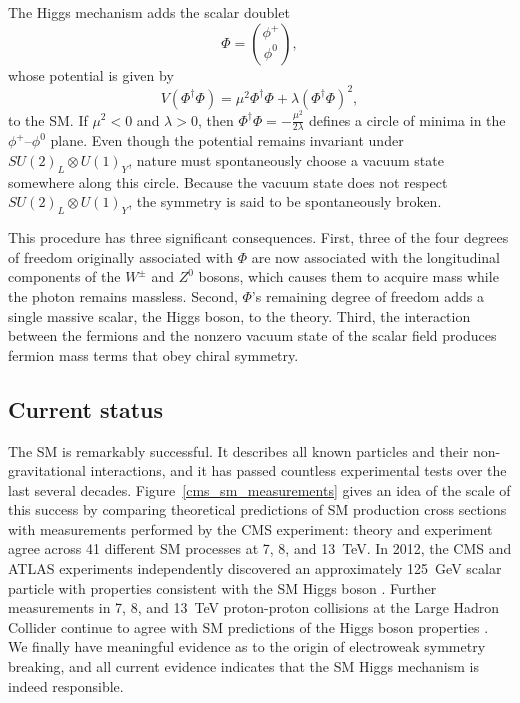 The Higgs mechanism adds the scalar doublet
\begin{equation}
    \Phi = \binom{\phi^{+}}{\phi^{0}},
\end{equation}
whose potential is given by
\begin{equation}
    V(\Phi^{\dagger}\Phi) = \mu^{2}\Phi^{\dagger}\Phi + \lambda(\Phi^{\dagger}\Phi)^{2},
\end{equation}
to the SM. If $\mu^{2}<0$ and $\lambda>0$, then $\Phi^{\dagger}\Phi = -\frac{\mu^{2}}{2\lambda}$ defines a circle of minima in the $\phi^{+}$--$\phi^{0}$ plane. Even though the potential remains invariant under $SU(2)_{L} \otimes U(1)_{Y}$, nature must spontaneously choose a vacuum state somewhere along this circle. Because the vacuum state does not respect $SU(2)_{L} \otimes U(1)_{Y}$, the symmetry is said to be spontaneously broken.

This procedure has three significant consequences. First, three of the four degrees of freedom originally associated with $\Phi$ are now associated with the longitudinal components of the $W^{\pm}$ and $Z^{0}$ bosons, which causes them to acquire mass while the photon remains massless. Second, $\Phi$'s remaining degree of freedom adds a single massive scalar, the Higgs boson, to the theory. Third, the interaction between the fermions and the nonzero vacuum state of the scalar field produces fermion mass terms that obey chiral symmetry.


\subsection{Current status}
\label{sm_status}
The SM is remarkably successful. It describes all known particles and their non-gravitational interactions, and it has passed countless experimental tests over the last several decades. Figure~\ref{cms_sm_measurements} gives an idea of the scale of this success by comparing theoretical predictions of SM production cross sections with measurements performed by the CMS experiment: theory and experiment agree across 41 different SM processes at \num{7}, \num{8}, and \SI{13}{\TeV}. In 2012, the CMS and ATLAS experiments  independently discovered an approximately \SI{125}{\GeV} scalar particle with properties consistent with the SM Higgs boson \cite{cms_higgs, atlas_higgs}. Further measurements in \num{7}, \num{8}, and \SI{13}{\TeV} proton-proton collisions at the Large Hadron Collider continue to agree with SM predictions of the Higgs boson properties \cite{cms_higgs_summary, atlas_higgs_summary}. We finally have meaningful evidence as to the origin of electroweak symmetry breaking, and all current evidence indicates that the SM Higgs mechanism is indeed responsible.

